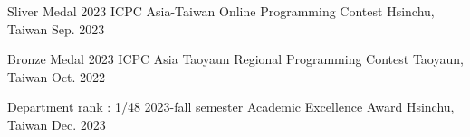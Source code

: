 



\begin{cvhonors}
%
\cvhonor
{Sliver Medal} 
{2023 ICPC Asia-Taiwan Online Programming Contest} 
{Hsinchu, Taiwan} 
{Sep. 2023}

\cvhonor
{Bronze Medal} 
{2023 ICPC Asia Taoyaun Regional Programming Contest} 
{Taoyaun, Taiwan} 
{Oct. 2022}


\cvhonor
{Department rank : 1/48} 
{2023-fall semester  Academic Excellence Award} 
{Hsinchu, Taiwan} 
{Dec. 2023}

\end{cvhonors}





%
